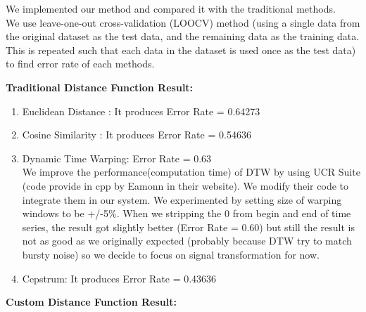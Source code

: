 
We implemented our method
and compared it with the traditional methods.
\\
We use leave-one-out cross-validation (LOOCV) method (using a single data from the original dataset as the test data, and the remaining data as the training data. This is repeated such that each data in the dataset is used once as the test data) to find error rate of each methods.\\
\begin{flushleft}
\textbf{Traditional Distance Function Result:}\\
\end{flushleft}

\begin{enumerate}

\item Euclidean Distance : It produces Error Rate = 0.64273 
\item Cosine Similarity : It produces Error Rate = 0.54636
\item Dynamic Time Warping: 
Error Rate = 0.63\\
We improve the performance(computation time) of DTW by using UCR Suite (code provide in cpp by Eamonn in their website). We modify their code to integrate them in our system. We experimented by setting size of warping windows to be +/-5\%. When we stripping the 0 from begin and end of time series, the result got slightly better (Error Rate = 0.60) but still the result is not as good as we originally expected (probably because DTW try to match bursty noise) so we decide to focus on signal transformation for now.
\item Cepstrum: It produces Error Rate = 0.43636 
\end{enumerate}

\begin{flushleft}
\textbf{Custom Distance Function Result:}\\
\end{flushleft}


